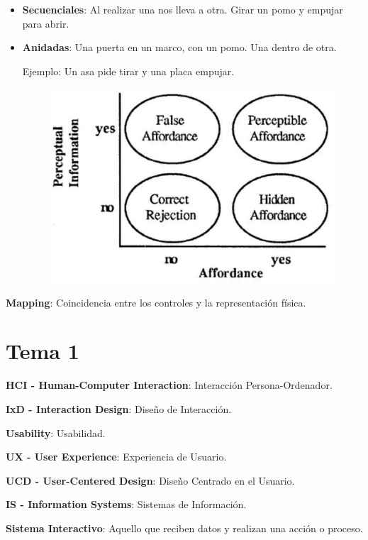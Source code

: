 \documentclass[12pt]{report} %
\begin{document}
\begin{itemize}
\item
  \textbf{Secuenciales}: Al realizar una nos lleva a otra. Girar un pomo
  y empujar para abrir.
\item
  \textbf{Anidadas}: Una puerta en un marco, con un pomo. Una dentro de
  otra.

  Ejemplo: Un asa pide tirar y una placa empujar.
  \begin{figure}[H]
	{\includegraphics[scale=.4]{Untitled.png}}
\end{figure}
\end{itemize}

\textbf{Mapping}: Coincidencia entre los controles y la representación
física.

\hypertarget{tema-1}{%
\chapter{Tema 1}\label{tema-1}}

\textbf{HCI - Human-Computer Interaction}: Interacción
Persona-Ordenador.

\textbf{IxD - Interaction Design}: Diseño de Interacción.

\textbf{Usability}: Usabilidad.

\textbf{UX - User Experience}: Experiencia de Usuario.

\textbf{UCD - User-Centered Design}: Diseño Centrado en el Usuario.

\textbf{IS - Information Systems}: Sistemas de Información.

\textbf{Sistema Interactivo}: Aquello que reciben datos y realizan una
acción o proceso.
\end{document}
